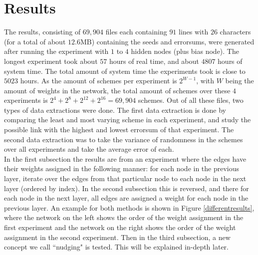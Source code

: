 \documentclass[a4paper, 10pt, notitlepage, twocolumn]{article}
\begin{document}
 \section{Results}
 \label{results}
 The results,  consisting of $69,904$ files each containing $91$ lines with $26$ characters (for a total of about $12.6$MB) containing the seeds and errorsums,  were generated after running the experiment with $1$ to $4$ hidden nodes (plus bias node). The longest experiment took about $57$ hours of real time, and about $4807$ hours of system time. The total amount of system time the experiments took is close to $5023$ hours. As the amount of schemes per experiment is $2^{W - 1}$, with $W$ being the amount of weights in the network, the total amount of schemes over these $4$ experiments is $2^4 + 2^8 + 2^{12} + 2^{16} = 69, 904$ schemes. Out of all these files, two types of data extractions were done. The first data extraction is done by comparing the least and most varying scheme in each experiment, and study the possible link with the highest and lowest errorsum of that experiment. The second data extraction was to take the variance of randomness in the schemes over all experiments and take the average error of each.\\
 In the first subsection the results are from an experiment where the edges have their weights assigned in the following manner: for each node in the previous layer, iterate over the edges from that particular node to each node in the next layer (ordered by index). In the second subsection this is reversed, and there for each node in the next layer, all edges are assigned a weight for each node in the previous layer. An example for both methods is shown in Figure \ref{differentresults}, where the network on the left shows the order of the weight assignment in the first experiment and the network on the right shows the order of the weight assignment in the second experiment. Then in the third subsection, a new concept we call ``nudging" is tested. This will be explained in-depth later.
 
\end{document}
